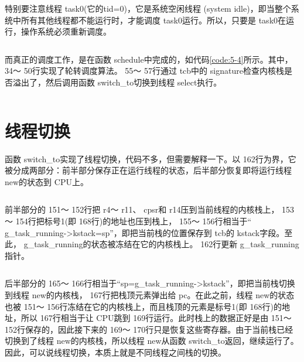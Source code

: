 \documentclass[main.tex]{subfiles}
\begin{document}
\begin{CJK*}{UTF8}{song}
\par
特别要注意线程 task0(它的tid=0)，它是系统空闲线程 (system idle)，即当整个系统中所有其他线程都不能运行时，才能调度 task0运行。所以，只要是 task0在运行，操作系统必须重新调度。

\begin{code}
\label{code:5-3}
\inputminted[firstline=7,lastline=30,linenos,numbersep=5pt,frame=lines,framesep=2mm]{c}{src/chapter05/kernel/timer.c}
\end{code}

而真正的调度工作，是在函数 schedule中完成的，如代码\ref{code:5-4}所示。其中， 34～ 50行实现了轮转调度算法。 55～ 57行通过 tcb中的 signature检查内核栈是否溢出了，然后调用函数 switch\_\-to切换到线程 select执行。

\begin{code}
\label{code:5-4}
\inputminted[firstline=29,lastline=61,linenos,numbersep=5pt,frame=lines,framesep=2mm]{c}{src/chapter05/kernel/task.c}
\end{code}

\section{线程切换}
函数 switch\_\-to实现了线程切换，代码不多，但需要解释一下。以 162行为界，它被分成两部分：前半部分保存正在运行线程的状态，后半部分恢复即将运行线程 new的状态到 CPU上。

\begin{code}
\label{code:5-5}
\inputminted[firstline=145,lastline=162,linenos,numbersep=5pt,frame=lines,framesep=2mm]{c}{src/chapter05/kernel/machdep.c}
\end{code}

前半部分的 151～ 152行把 r4～ r11、 cpsr和 r14压到当前线程的内核栈上， 153～ 154行把标号1(即 168行)的地址也压到栈上， 155～ 156行相当于“ g\_\-task\_\-running-\textgreater kstack=sp”，即把当前栈的位置保存到 tcb的 kstack字段。至此， g\_\-task\_\-running的状态被冻结在它的内核栈上。 162行更新 g\_\-task\_\-running指针。

\begin{code}
\label{code:5-6}
\inputminted[firstline=162,lastline=174,linenos,numbersep=5pt,frame=lines,framesep=2mm]{c}{src/chapter05/kernel/machdep.c}
\end{code}

后半部分的 165～ 166行相当于“sp=g\_\-task\_\-running-\textgreater kstack”，即把当前栈切换到线程 new的内核栈， 167行把栈顶元素弹出给 pc。在此之前，线程 new的状态也被 151～ 156行冻结在它的内核栈上，而且栈顶的元素是标号1(即 168行)的地址，所以 167行相当于让 CPU跳到 169行运行。此时栈上的数据正好是由 151～ 152行保存的，因此接下来的 169～ 170行只是恢复这些寄存器。由于当前栈已经切换到了线程 new的内核栈，所以线程 new从函数 switch\_\-to返回，继续运行了。因此，可以说线程切换，本质上就是不同线程之间栈的切换。


\end{CJK*}
\end{document}
